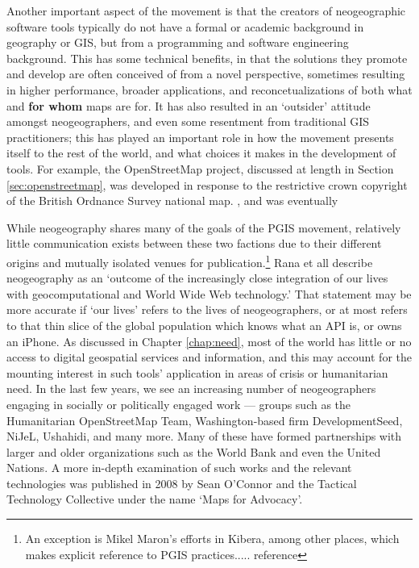 \documentclass[11pt,oneside,notitlepage]{report}
\begin{document}
Another important aspect of the movement is that the creators of neogeographic software tools typically do not have a formal or academic background in geography or GIS, but from a programming and software engineering background. This has some technical benefits, in that the solutions they promote and develop are often conceived of from a novel perspective, sometimes resulting in higher performance, broader applications, and reconcetualizations of both what and \textbf{for whom} maps are for. It has also resulted in an `outsider' attitude amongst neogeographers, and even some resentment from traditional GIS practitioners; this has played an important role in how the movement presents itself to the rest of the world, and what choices it makes in the development of tools. For example, the OpenStreetMap project, discussed at length in Section \ref{sec:openstreetmap}, was developed in response to the restrictive crown copyright of the British Ordnance Survey national map. \cite{chilton-crowdsourcing}, and was eventually 

While neogeography shares many of the goals of the PGIS movement, relatively little communication exists between these two factions due to their different origins and mutually isolated venues for publication.\footnote{An exception is Mikel Maron's efforts in Kibera, among other places, which makes explicit reference to PGIS practices..... reference} Rana et all describe neogeography as an `outcome of the increasingly close integration of our lives with geocomputational and World Wide Web technology.' That statement may be more accurate if `our lives' refers to the lives of neogeographers, or at most refers to that thin slice of the global population which knows what an API is, or owns an iPhone. As discussed in Chapter \ref{chap:need}, most of the world has little or no access to digital geospatial services and information, and this may account for the mounting interest in such tools' application in areas of crisis or humanitarian need. In the last few years, we see an increasing number of neogeographers engaging in socially or politically engaged work --- groups such as the Humanitarian OpenStreetMap Team, Washington-based firm DevelopmentSeed, NiJeL, Ushahidi, and many more. Many of these have formed partnerships with larger and older organizations such as the World Bank and even the United Nations. A more in-depth examination of such works and the relevant technologies was published in 2008 by Sean O'Connor and the Tactical Technology Collective under the name `Maps for Advocacy'. \cite{oconnor2008maps} 
\end{document}
